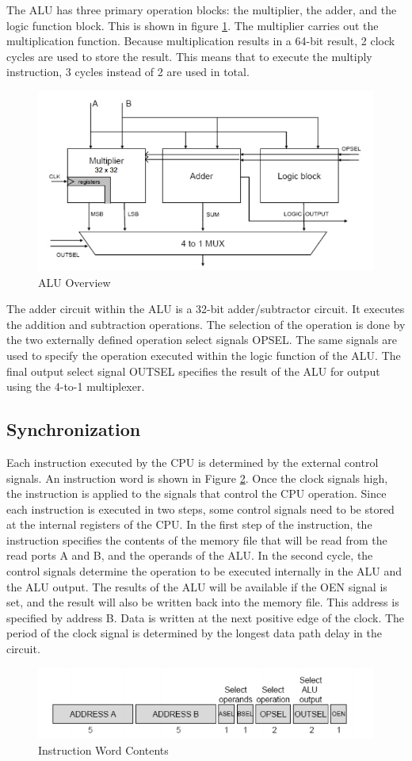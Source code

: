 \documentclass[12pt]{article}
\begin{document}
The ALU has three primary operation blocks: the multiplier, the adder, and the logic function block. This is shown in figure \ref{fig:alu-overview}. The multiplier carries out the multiplication function. Because multiplication results in a 64-bit result, 2 clock cycles are used to store the result. This means that to execute the multiply instruction, 3 cycles instead of 2 are used in total.
\begin{figure}[H]
\centering
\includegraphics[width=0.7\linewidth]{alu-overview}
\caption{ALU Overview}
\label{fig:alu-overview}
\end{figure}
The adder circuit within the ALU is a 32-bit adder/subtractor circuit. It executes the addition and subtraction operations. The selection of the operation is done by the two externally defined operation select signals OPSEL. The same signals are used to specify the operation executed within the logic function of the ALU. The final output select signal OUTSEL specifies the result of the ALU for output using the 4-to-1 multiplexer.

\subsection{Synchronization}
Each instruction executed by the CPU is determined by the external control signals. An instruction word is shown in Figure \ref{fig:instruc}. Once the clock signals high, the instruction is applied to the signals that control the CPU operation. Since each instruction is executed in two steps, some control signals need to be stored at the internal registers of the CPU. In the first step of the instruction, the instruction specifies the contents of the memory file that will be read from the read ports A and B, and the operands of the ALU. In the second cycle, the control signals determine the operation to be executed internally in the ALU and the ALU output. The results of the ALU will be available if the OEN signal is set, and the result will also be written back into the memory file. This address is specified by address B. Data is written at the next positive edge of the clock. The period of the clock signal is determined by the longest data path delay in the circuit.
\begin{figure}[H]
\centering
\includegraphics[width=0.7\linewidth]{instruc}
\caption{Instruction Word Contents}
\label{fig:instruc}
\end{figure}
\end{document}
